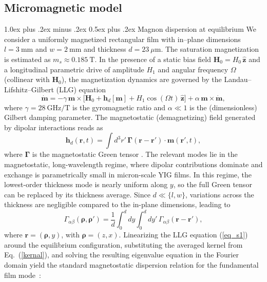 \documentclass[
twocolumn,

superscriptaddress,









 amsmath,amssymb,
 aps,


prl,




]{revtex4-2}
\makeatletter
\providecommand{\subsubsection}{}
\renewcommand{\subsubsection}{
  \@startsection{subsubsection}{3}{0pt}
    {1.0ex plus .2ex minus .2ex}
    {0.5ex plus .2ex}
    {\normalfont\normalsize\bfseries\filcenter}
}
\makeatother
\begin{document}
\vskip 15pt

\subsection{Micromagnetic model}



\subsubsection{Magnon dispersion at equilibrium}
We consider a uniformly magnetized rectangular film with in–plane dimensions $l=3~\mathrm{mm}$ and $w=2~\mathrm{mm}$ and thickness $d=23~\mu\mathrm{m}$. The saturation magnetization is estimated as $m_s \approx 0.185\ \text{T}$. In the presence of a static bias field $\mathbf H_0=H_0\,\hat{\mathbf z}$ and a longitudinal parametric drive of amplitude $H_1$ and angular frequency $\Omega$ (collinear with $\mathbf H_0$), the magnetization dynamics are governed by the Landau–Lifshitz–Gilbert (LLG) equation
\begin{equation}
\dot{\mathbf m}
= -\gamma\,\mathbf m \times \!\Big[\mathbf H_0 + \mathbf h_d[\mathbf m] + H_1\cos(\Omega t)\,\hat{\mathbf z}\Big]
+ \alpha\,\mathbf m \times \dot{\mathbf m},
\label{eq_s1}
\end{equation}
where $\gamma = 28\ \text{GHz/T}$ is the gyromagnetic ratio and $\alpha\ll1$ is the (dimensionless) Gilbert damping parameter. The magnetostatic (demagnetizing) field generated by dipolar interactions reads as
\begin{equation}
\mathbf h_d(\mathbf r,t)=\int d^3 r'\,\boldsymbol\Gamma(\mathbf r-\mathbf r')\cdot\mathbf m(\mathbf r',t), \label{eq_s1.2}
\end{equation}
where $\boldsymbol\Gamma$ is the magnetostatic Green tensor \cite{guslienko2011magnetostatic}. The relevant modes lie in the magnetostatic, long-wavelength regime, where dipolar contributions dominate and exchange is parametrically small in micron-scale YIG films.
In this regime, the lowest-order thickness mode is nearly uniform along $y$,
so the full Green tensor can be replaced by its thickness average.
Since $d \ll \{l, w\}$, variations across the thickness are negligible compared
to the in-plane dimensions, leading to
\begin{equation}
\Gamma_{\alpha\beta}(\boldsymbol{\rho},\boldsymbol{\rho}')
= \frac{1}{d} \int_0^d \! dy \int_0^d \! dy'\,
\Gamma_{\alpha\beta}(\mathbf{r}-\mathbf{r}'),\label{kernal}
\end{equation}
where $\mathbf r=(\boldsymbol\rho,y)$, with  $\boldsymbol\rho=(z,x)$. Linearizing the LLG equation (\ref{eq_s1}) around the equilibrium configuration, substituting the averaged kernel from Eq.~(\ref{kernal}), and solving the resulting eigenvalue equation in the Fourier domain yield the standard magnetostatic dispersion relation for the fundamental film mode~\cite{jorzick1999brillouin}:
\end{document}
